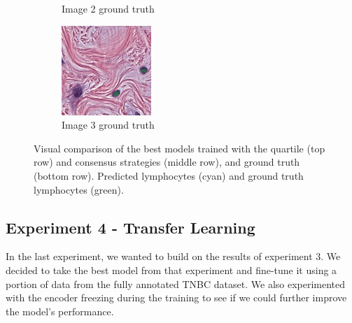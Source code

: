 \begin{figure}[H]
\begin{subfigure}[b]{0.32\textwidth}
    \caption{Image 2 ground truth}
  \end{subfigure}\hfill
  \begin{subfigure}[b]{0.32\textwidth}
    \centering
    \includegraphics[width=\linewidth]{assets/images/for_presentation/exp3-3-gt.png}
    \caption{Image 3 ground truth}
  \end{subfigure}
  \caption{Visual comparison of the best models trained with the quartile (top row) and consensus strategies (middle row), and ground truth (bottom row). Predicted lymphocytes (cyan) and ground truth lymphocytes (green).}
  \label{fig:exp3-results}
\end{figure}


\subsection{Experiment 4 - Transfer Learning}
In the last experiment, we wanted to build on the results of experiment 3. We decided to take the best model from that experiment and fine-tune it using a portion of data from the fully annotated TNBC dataset. We also experimented with the encoder freezing during the training to see if we could further improve the model's performance. 

